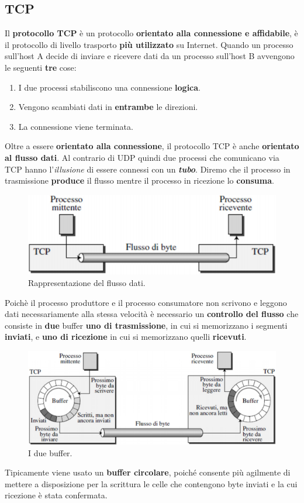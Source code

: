 \documentclass[11pt,a4paper,oneside]{book}
\theoremstyle{definition}
\begin{document}
\subsection{TCP}
\label{sec:TCP}
Il \textbf{protocollo TCP} è un protocollo \textbf{orientato alla connessione e affidabile}, è il protocollo di livello trasporto \textbf{più utilizzato} su Internet.
Quando un processo sull'host A decide di inviare e ricevere dati da un processo sull'host B avvengono le seguenti \textbf{tre} cose:
\begin{enumerate}
	\item I due processi stabiliscono una connessione \textbf{logica}.
	\item Vengono scambiati dati in \textbf{entrambe} le direzioni.
	\item La connessione viene terminata.
\end{enumerate}
Oltre a essere \textbf{orientato alla connessione}, il protocollo TCP è anche \textbf{orientato al flusso dati}. Al contrario di UDP quindi due processi che comunicano via TCP hanno l'\textit{illusione} di essere connessi con un \textit{\textbf{tubo}}. Diremo che il processo in trasmissione \textbf{produce} il flusso
mentre il processo in ricezione lo \textbf{consuma}.
\begin{figure}[!h]
	\includegraphics[scale=0.5]{Immagini/TCP_flow.png}
	\centering
	\caption{Rappresentazione del flusso dati.}
\end{figure}\newline
Poichè il processo produttore e il processo consumatore non scrivono e leggono dati necessariamente alla stessa velocità è necessario un \textbf{controllo del flusso} che consiste in \textbf{due} buffer \textbf{uno di trasmissione}, in cui si memorizzano i segmenti \textbf{inviati}, e \textbf{uno di ricezione} in cui si memorizzano quelli \textbf{ricevuti}.
\begin{figure}[!h]
	\includegraphics[scale=0.5]{Immagini/TCP_buffers.png}
	\centering
	\caption{I due buffer.}
\end{figure}\newline
Tipicamente viene usato un \textbf{buffer circolare}, poiché consente più agilmente di mettere a disposizione per la scrittura le celle che contengono byte inviati e la cui ricezione è stata confermata.
\end{document}
